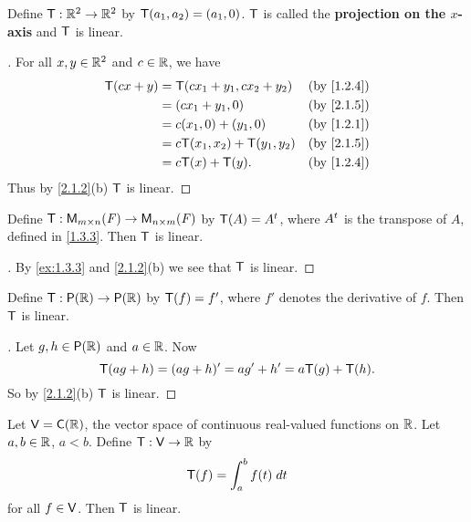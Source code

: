 \begin{eg}\label{2.1.5}
  Define \(\mathsf{T} : \mathbb{R}^2 \to \mathbb{R}^2\) by \(\mathsf{T}(a_1, a_2) = (a_1, 0)\).
  \(\mathsf{T}\) is called the \textbf{projection on the \(x\)-axis} and \(\mathsf{T}\) is linear.
\end{eg}

\begin{proof}[]
  For all \(x, y \in \mathbb{R}^2\) and \(c \in \mathbb{R}\), we have
  \begin{align*}
    \T(cx + y) & = \T(cx_1 + y_1, cx_2 + y_2)   &  & \text{(by \cref{1.2.4})} \\
               & = (cx_1 + y_1, 0)              &  & \text{(by \cref{2.1.5})} \\
               & = c(x_1, 0) + (y_1, 0)         &  & \text{(by \cref{1.2.1})} \\
               & = c\T(x_1, x_2) + \T(y_1, y_2) &  & \text{(by \cref{2.1.5})} \\
               & = c\T(x) + \T(y).              &  & \text{(by \cref{1.2.4})}
  \end{align*}
  Thus by \cref{2.1.2}(b) \(\mathsf{T}\) is linear.
\end{proof}

\begin{eg}\label{2.1.6}
  Define \(\mathsf{T} : \mathsf{M}_{{m} \times n}({\mathit{F}}) \to \mathsf{M}_{{n} \times m}({\mathit{F}})\) by \(\mathsf{T}(A) = {A}^{t}\), where \({A}^{t}\) is the transpose of \(A\), defined in \cref{1.3.3}.
  Then \(\mathsf{T}\) is linear.
\end{eg}

\begin{proof}[]
  By \cref{ex:1.3.3} and \cref{2.1.2}(b) we see that \(\mathsf{T}\) is linear.
\end{proof}

\begin{eg}\label{2.1.7}
  Define \(\T : \ps{\R} \to \ps{\R}\) by \(\mathsf{T}(f) = f'\), where \(f'\) denotes the derivative of \(f\).
  Then \(\mathsf{T}\) is linear.
\end{eg}

\begin{proof}[]
  Let \(g, h \in \ps{\R}\) and \(a \in \mathbb{R}\).
  Now
  \[
    \mathsf{T}(ag + h) = (ag + h)' = ag' + h' = a\mathsf{T}(g) + \mathsf{T}(h).
  \]
  So by \cref{2.1.2}(b) \(\mathsf{T}\) is linear.
\end{proof}

\begin{eg}\label{2.1.8}
  Let \(\V = \cfs{\R}\), the vector space of continuous real-valued functions on \(\mathbb{R}\).
  Let \(a, b \in \mathbb{R}\), \(a < b\).
  Define \(\mathsf{T} : \mathsf{V} \to \mathbb{R}\) by
  \[
    \mathsf{T}(f) = \int_a^b f(t) \; dt
  \]
  for all \(f \in \mathsf{V}\).
  Then \(\mathsf{T}\) is linear.
\end{eg}

